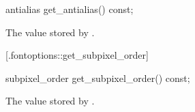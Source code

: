 %
%
\begin{itemdecl}
antialias get_antialias() const;
\end{itemdecl}
\begin{itemdescr}
	\pnum
	\returns
	The  value stored by .
\end{itemdescr}

 [\iotwod.fontoptions::get_subpixel_order] 
{}

%
%
\begin{itemdecl}
subpixel_order get_subpixel_order() const;
\end{itemdecl}
\begin{itemdescr}
	\pnum
	\returns
	The  value stored by .
\end{itemdescr}
